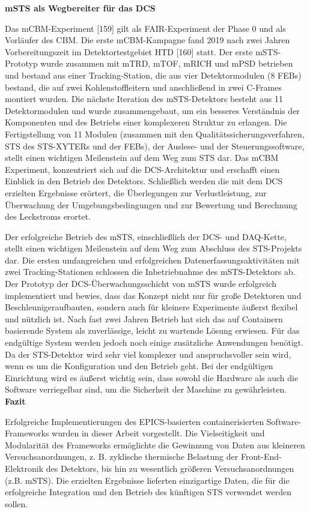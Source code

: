 \bigbreak
\textbf{\gls{mSTS} als Wegbereiter für das DCS}
\bigbreak

Das \gls{mCBM}-Experiment [159] gilt als FAIR-Experiment der Phase 0 und als Vorläufer des CBM. Die erste \gls{mCBM}-Kampagne fand 2019 nach zwei Jahren Vorbereitungszeit im Detektortestgebiet HTD [160] statt. Der erste \gls{mSTS}-Prototyp wurde zusammen mit mTRD, mTOF, mRICH und mPSD betrieben und bestand aus einer Tracking-Station, die aus vier Detektormodulen (8 FEBs) bestand, die auf zwei Kohlenstoffleitern und anschließend in zwei C-Frames montiert wurden. Die nächste Iteration des \gls{mSTS}-Detektors besteht aus 11 Detektormodulen und wurde zusammengebaut, um ein besseres Verständnis der Komponenten und des Betriebs einer komplexeren Struktur zu erlangen. Die Fertigstellung von 11 Modulen (zusammen mit den Qualitätssicherungsverfahren, \gls{STS} des \gls{STS}-XYTERs und der FEBs), der Auslese- und der Steuerungssoftware, stellt einen wichtigen Meilenstein auf dem Weg zum \gls{STS} dar. Das \gls{mCBM} Experiment, konzentriert sich auf die DCS-Architektur und erschafft einen Einblick in den Betrieb des Detektors. Schließlich werden die mit dem DCS erzielten Ergebnisse erörtert, die Überlegungen zur Verlustleistung, zur Überwachung der Umgebungsbedingungen und zur Bewertung und Berechnung des Leckstroms erortet.

Der erfolgreiche Betrieb des \gls{mSTS}, einschließlich der \gls{DCS}- und \gls{DAQ}-Kette, stellt einen wichtigen Meilenstein auf dem Weg zum Abschluss des \gls{STS}-Projekts dar. Die ersten umfangreichen und erfolgreichen Datenerfassungsaktivitäten mit zwei Tracking-Stationen schlossen die Inbetriebnahme des \gls{mSTS}-Detektors ab. Der Prototyp der \gls{DCS}-Überwachungsschicht von \gls{mSTS} wurde erfolgreich implementiert und bewies, dass das Konzept nicht nur für große Detektoren und Beschleunigeraufbauten, sondern auch für kleinere Experimente äußerst flexibel und nützlich ist. Nach fast zwei Jahren Betrieb hat sich das auf Containern basierende System als zuverlässige, leicht zu wartende Lösung erwiesen. Für das endgültige System werden jedoch noch einige zusätzliche Anwendungen benötigt. Da der \gls{STS}-Detektor wird sehr viel komplexer und anspruchsvoller sein wird, wenn es um die Konfiguration und den Betrieb geht. Bei der endgültigen Einrichtung wird es äußerst wichtig sein, dass sowohl die Hardware als auch die Software verriegelbar sind, um die Sicherheit der Maschine zu gewährleisten.
\bigbreak
\textbf{Fazit}
\bigbreak

Erfolgreiche Implementierungen des EPICS-basierten containerisierten Software-Frameworks wurden in dieser Arbeit vorgestellt. Die Vielseitigkeit und Modularität des Frameworks ermöglichte die Gewinnung von Daten aus kleineren Versuchsanordnungen, z. B. zyklische thermische Belastung der Front-End-Elektronik des Detektors, bis hin zu wesentlich größeren Versuchsanordnungen (z.B. \gls{mSTS}). Die erzielten Ergebnisse lieferten einzigartige Daten, die für die erfolgreiche Integration und den Betrieb des künftigen \gls{STS} verwendet werden sollen.

